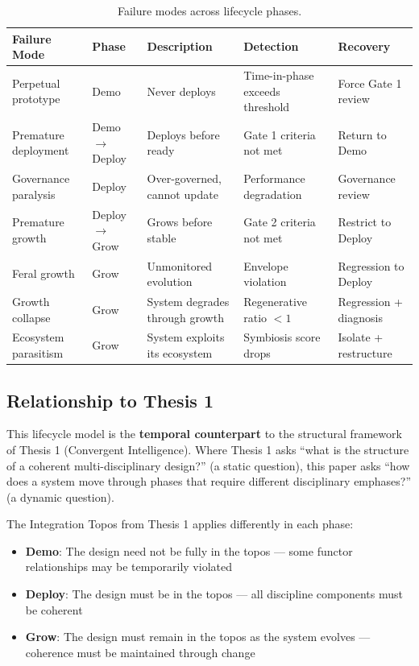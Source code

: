 \documentclass[11pt,a4paper]{article}
\begin{document}
\begin{table}[htbp]
\centering
\small
\begin{tabular}{>{\raggedright\arraybackslash}p{2.2cm} >{\raggedright\arraybackslash}p{1.5cm} >{\raggedright\arraybackslash}p{2.8cm} >{\raggedright\arraybackslash}p{2.8cm} >{\raggedright\arraybackslash}p{2.8cm}}
\toprule
\textbf{Failure Mode} & \textbf{Phase} & \textbf{Description} & \textbf{Detection} & \textbf{Recovery} \\
\midrule
Perpetual prototype & Demo & Never deploys & Time-in-phase exceeds threshold & Force Gate 1 review \\
Premature deployment & Demo$\rightarrow$Deploy & Deploys before ready & Gate 1 criteria not met & Return to Demo \\
Governance paralysis & Deploy & Over-governed, cannot update & Performance degradation & Governance review \\
Premature growth & Deploy$\rightarrow$Grow & Grows before stable & Gate 2 criteria not met & Restrict to Deploy \\
Feral growth & Grow & Unmonitored evolution & Envelope violation & Regression to Deploy \\
Growth collapse & Grow & System degrades through growth & Regenerative ratio $< 1$ & Regression + diagnosis \\
Ecosystem parasitism & Grow & System exploits its ecosystem & Symbiosis score drops & Isolate + restructure \\
\bottomrule
\end{tabular}
\caption{Failure modes across lifecycle phases.}
\label{tab:failure-modes}
\end{table}

\subsection{Relationship to Thesis 1}

This lifecycle model is the \textbf{temporal counterpart} to the structural framework of Thesis 1 (Convergent Intelligence). Where Thesis 1 asks ``what is the structure of a coherent multi-disciplinary design?'' (a static question), this paper asks ``how does a system move through phases that require different disciplinary emphases?'' (a dynamic question).

The Integration Topos from Thesis 1 applies differently in each phase:
\begin{itemize}[nosep]
    \item \textbf{Demo}: The design need not be fully in the topos --- some functor relationships may be temporarily violated
    \item \textbf{Deploy}: The design must be in the topos --- all discipline components must be coherent
    \item \textbf{Grow}: The design must remain in the topos as the system evolves --- coherence must be maintained through change
\end{itemize}
\end{document}
